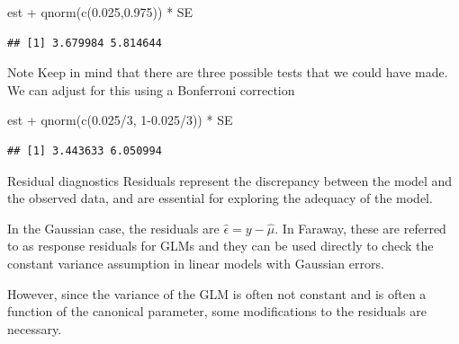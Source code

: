 \documentclass[
  ignorenonframetext,
]{beamer}
\newenvironment{Shaded}{\begin{snugshade}}{\end{snugshade}}
\newcommand{\DecValTok}[1]{\textcolor[rgb]{0.00,0.00,0.81}{#1}}
\newcommand{\FloatTok}[1]{\textcolor[rgb]{0.00,0.00,0.81}{#1}}
\newcommand{\FunctionTok}[1]{\textcolor[rgb]{0.00,0.00,0.00}{#1}}
\newcommand{\NormalTok}[1]{#1}
\newcommand{\SpecialCharTok}[1]{\textcolor[rgb]{0.00,0.00,0.00}{#1}}
\begin{document}
\begin{frame}[fragile]{}
\vspace{12pt}
\tiny

\begin{Shaded}
\begin{Highlighting}[]
\NormalTok{est }\SpecialCharTok{+} \FunctionTok{qnorm}\NormalTok{(}\FunctionTok{c}\NormalTok{(}\FloatTok{0.025}\NormalTok{,}\FloatTok{0.975}\NormalTok{)) }\SpecialCharTok{*}\NormalTok{ SE}
\end{Highlighting}
\end{Shaded}

\begin{verbatim}
## [1] 3.679984 5.814644
\end{verbatim}
\end{frame}

\begin{frame}[fragile]{Note}
\protect\hypertarget{note}{}
Keep in mind that there are three possible tests that we could have
made. We can adjust for this using a Bonferroni correction

\vspace{12pt}

\begin{Shaded}
\begin{Highlighting}[]
\NormalTok{est }\SpecialCharTok{+} \FunctionTok{qnorm}\NormalTok{(}\FunctionTok{c}\NormalTok{(}\FloatTok{0.025}\SpecialCharTok{/}\DecValTok{3}\NormalTok{, }\DecValTok{1}\FloatTok{{-}0.025}\SpecialCharTok{/}\DecValTok{3}\NormalTok{)) }\SpecialCharTok{*}\NormalTok{ SE}
\end{Highlighting}
\end{Shaded}

\begin{verbatim}
## [1] 3.443633 6.050994
\end{verbatim}
\end{frame}

\begin{frame}{Residual diagnostics}
\protect\hypertarget{residual-diagnostics}{}
Residuals represent the discrepancy between the model and the observed
data, and are essential for exploring the adequacy of the model.

\vspace{12pt}

In the Gaussian case, the residuals are \(\hat\epsilon = y - \hat\mu\).
In Faraway, these are referred to as response residuals for GLMs and
they can be used directly to check the constant variance assumption in
linear models with Gaussian errors.

\vspace{12pt}

However, since the variance of the GLM is often not constant and is
often a function of the canonical parameter, some modifications to the
residuals are necessary.
\end{frame}
\end{document}
